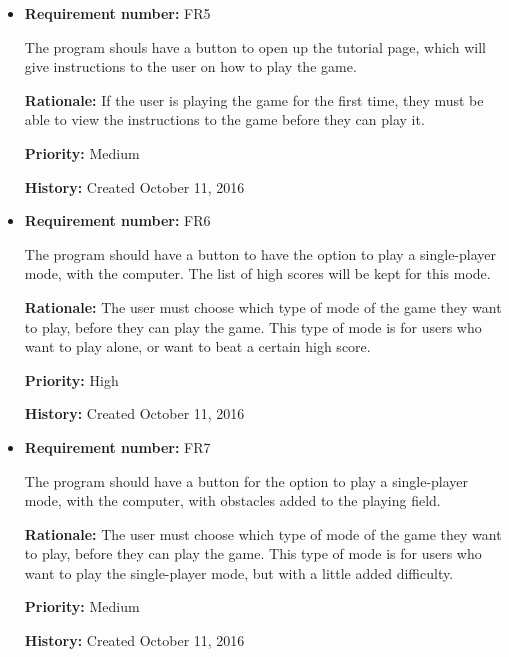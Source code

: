 \documentclass[12pt,letterpaper]{article}
\begin{document}
\begin{reqbox}
	\begin{itemize}
		\item \textbf{Requirement number: }FR5

		The program shouls have a button to open up the tutorial page, which will give instructions to the user on how to play the game.

		\textbf{Rationale: }If the user is playing the game for the first time, they must be able to view the instructions to the game before they can play it.

		\textbf{Priority: }Medium

		\textbf{History: }Created October 11, 2016
	\end{itemize}
\end{reqbox}

\begin{reqbox}
	\begin{itemize}

		\item \textbf{Requirement number: }FR6

		The program should have a button to have the option to play a single-player mode, with the computer. The list of high scores will be kept for this mode.

		\textbf{Rationale: }The user must choose which type of mode of the game they want to play, before they can play the game. This type of mode is for users who want to play alone, or want to beat a certain high score.

		\textbf{Priority: }High

		\textbf{History: }Created October 11, 2016

	\end{itemize}
\end{reqbox}

\begin{reqbox}
	\begin{itemize}
		\item \textbf{Requirement number: }FR7

		The program should have a button for the option to play a single-player mode, with the computer, with obstacles added to the playing field. 

		\textbf{Rationale: }The user must choose which type of mode of the game they want to play, before they can play the game. This type of mode is for users who want to play the single-player mode, but with a little added difficulty.

		\textbf{Priority: }Medium

		\textbf{History: }Created October 11, 2016
	\end{itemize}
\end{reqbox}
\end{document}
